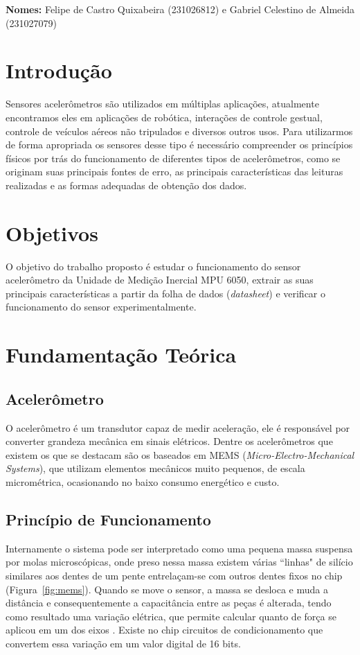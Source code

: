 \documentclass[a4paper, 10pt]{article} %
\begin{document}


\textbf{Nomes:} Felipe de Castro Quixabeira (231026812) e Gabriel Celestino de Almeida (231027079)
\section{Introdução}
Sensores acelerômetros são utilizados em múltiplas aplicações, atualmente encontramos eles em aplicações de robótica, interações de controle gestual, controle de veículos aéreos não tripulados e diversos outros usos.
Para utilizarmos de forma apropriada os sensores desse tipo é necessário compreender os princípios físicos por trás do funcionamento de diferentes tipos de acelerômetros, como se originam suas principais fontes de erro, as principais características das leituras realizadas e as formas adequadas de obtenção dos dados.

\section{Objetivos}
O objetivo do trabalho proposto é estudar o funcionamento do sensor acelerômetro da Unidade de Medição Inercial MPU 6050, extrair as suas principais características a partir da folha de dados (\textit{datasheet}) e verificar o funcionamento do sensor experimentalmente.

\section{Fundamentação Teórica}

\subsection{Acelerômetro}
O acelerômetro é um transdutor capaz de medir aceleração, ele é responsável por converter grandeza mecânica em sinais elétricos. Dentre os acelerômetros que existem os que se destacam são os baseados em MEMS (\textit{Micro-Electro-Mechanical Systems}), que utilizam elementos mecânicos muito pequenos, de escala micrométrica, ocasionando no baixo consumo energético e custo.

\subsection{Princípio de Funcionamento}
Internamente o sistema pode ser interpretado como uma pequena massa suspensa por molas microscópicas, onde preso nessa massa existem várias ``linhas" de silício similares aos dentes de um pente entrelaçam-se com outros dentes fixos no chip (Figura~\ref{fig:mems}). Quando se move o sensor, a massa se desloca e muda a distância e consequentemente a capacitância entre as peças é alterada, tendo como resultado uma variação elétrica, que permite calcular quanto de força se aplicou em um dos eixos \cite[pp.~224--226]{aguirre2013fundamentos}. Existe no chip circuitos de condicionamento que convertem essa variação em um valor digital de 16 bits.
\end{document}
